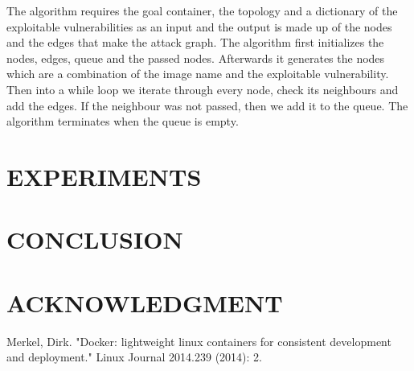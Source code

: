 \documentclass[letterpaper, 10 pt, conference]{ieeeconf}  %
\begin{document}
The algorithm requires the goal container, the topology and a dictionary of the exploitable vulnerabilities as an input and the output is made up of the nodes and the edges that make the attack graph. 
The algorithm first initializes the nodes, edges, queue and the passed nodes. Afterwards it generates the nodes which are a combination of the image name and the exploitable vulnerability.
Then into a while loop we iterate through every node, check its neighbours and add the edges. If the neighbour was not passed, then we add it to the queue. The algorithm terminates when the queue is empty.
\section{EXPERIMENTS}
\section{CONCLUSION}




\addtolength{\textheight}{-12cm}   %








\section*{ACKNOWLEDGMENT}







\begin{thebibliography}{99}

 Merkel, Dirk. "Docker: lightweight linux containers for consistent development and deployment." Linux Journal 2014.239 (2014): 2.







\end{thebibliography}
\end{document}
